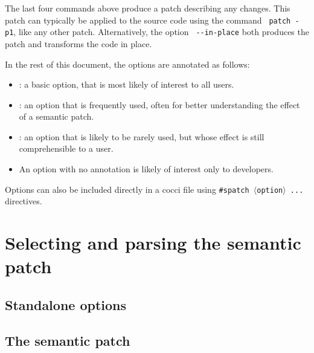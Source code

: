 The last four commands above produce a patch describing any changes.  This
patch can typically be applied to the source code using the command {\tt
  patch -p1}, like any other patch.  Alternatively, the option {\tt
  -{}-in-place} both produces the patch and transforms the code in place.

In the rest of this document, the options are annotated as follows:
\begin{itemize}
\item \FilledBigDiamondshape: a basic option, that is most likely of
  interest to all users.
\item \BigLowerDiamond: an option that is frequently used, often for better
understanding the effect of a semantic patch.
\item \BigDiamondshape: an option that is likely to be rarely used, but
  whose effect is still comprehensible to a user.
\item An option with no annotation is likely of interest only to
  developers.
\end{itemize}

Options can also be included directly in a cocci file using
{\tt\#spatch $\langle$option$\rangle$ ...} directives.

\section{Selecting and parsing the semantic patch}

\subsection{Standalone options}



\subsection{The semantic patch}


